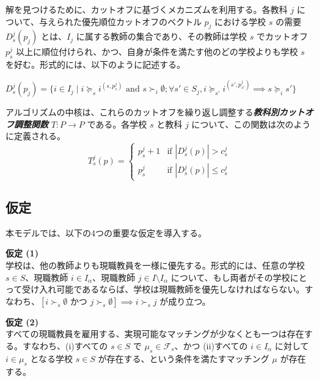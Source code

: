 \documentclass[12pt, a4paper]{article}
\theoremstyle{definition}
\theoremstyle{remark}
\theoremstyle{plain}
\begin{document}
解を見つけるために、カットオフに基づくメカニズムを利用する。各教科 $j$ について、与えられた優先順位カットオフのベクトル $p_j$ における学校 $s$ の需要 $D^j_s(p_j)$ とは、$I_j$ に属する教師の集合であり、その教師は学校 $s$ でカットオフ $p^j_s$ 以上に順位付けられ、かつ、自身が条件を満たす他のどの学校よりも学校 $s$ を好む。形式的には、以下のように記述する。

$D^j_s(p_j) = \{ i \in I_j \mid i \succeq_s i^{(s,p^j_s)} \text{ and } s \succ_i \emptyset; \forall s' \in S_j, i \succeq_{s'} i^{(s',p^j_{s'})} \implies s \succeq_i s' \}$

アルゴリズムの中核は、これらのカットオフを繰り返し調整する\textbf{\textit{教科別カットオフ調整関数}} $T : P \rightarrow P$ である。各学校 $s$ と教科 $j$ について、この関数は次のように定義される。
\[
T_s^j(p) =
\begin{cases}
p_s^j + 1 & \text{if } | D_s^j(p) | > c^j_s \\
p_s^j     & \text{if } | D_s^j(p) | \leq c^j_s
\end{cases}
\]

\subsection{仮定}
本モデルでは、以下の4つの重要な仮定を導入する。


\vspace{0.5\baselineskip}
\noindent\textbf{仮定 (1)} \\
学校は、他の教師よりも現職教員を一様に優先する。形式的には、任意の学校 $s \in S$、現職教師 $i \in I_\alpha$、現職教師 $j \in I\setminus I_\alpha$ について、もし両者がその学校にとって受け入れ可能であるならば、学校は現職教師を優先しなければならない。すなわち、$[i \succ_s \emptyset \text{ かつ } j \succ_s \emptyset] \implies i \succ_s j$ が成り立つ。

\vspace{0.5\baselineskip}
\noindent\textbf{仮定 (2)} \\
すべての現職教員を雇用する、実現可能なマッチングが少なくとも一つは存在する。すなわち、(i)すべての $s \in S$ で $\mu_s \in \mathcal{F}_s$、かつ (ii)すべての $i \in I_\alpha$ に対して $i \in \mu_s$ となる学校 $s \in S$ が存在する、という条件を満たすマッチング $\mu$ が存在する。
\end{document}
